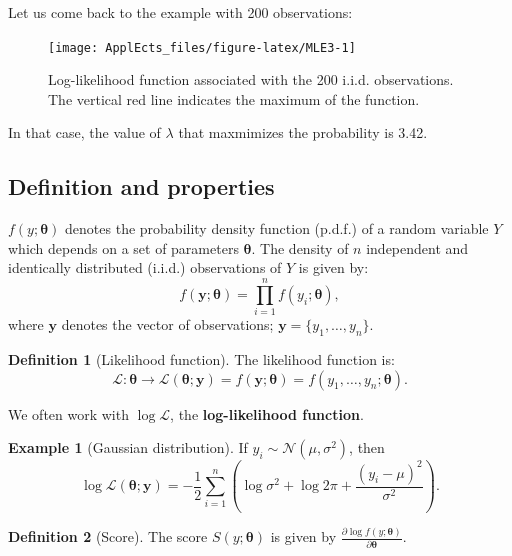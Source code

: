 \documentclass[
  12pt,
]{book}
\theoremstyle{definition}
\newtheorem{definition}{Definition}[chapter]
\theoremstyle{definition}
\newtheorem{example}{Example}[chapter]
\theoremstyle{definition}
\theoremstyle{definition}
\theoremstyle{remark}
\begin{document}
Let us come back to the example with 200 observations:

\begin{figure}
\texttt{[image: ApplEcts\_files/figure-latex/MLE3-1]} \caption{Log-likelihood function associated with the 200 i.i.d. observations. The vertical red line indicates the maximum of the function.}\label{fig:MLE3}
\end{figure}

In that case, the value of \(\lambda\) that maxmimizes the probability is 3.42.

\hypertarget{definition-and-properties}{%
\subsection{Definition and properties}\label{definition-and-properties}}

\(f(y;\boldsymbol\theta)\) denotes the probability density function (p.d.f.) of a random variable \(Y\) which depends on a set of parameters \(\boldsymbol\theta\). The density of \(n\) independent and identically distributed (i.i.d.) observations of \(Y\) is given by:
\[
f(\mathbf{y};\boldsymbol\theta) = \prod_{i=1}^n f(y_i;\boldsymbol\theta),
\]
where \(\mathbf{y}\) denotes the vector of observations; \(\mathbf{y} = \{y_1,\dots,y_n\}\).

\begin{definition}[Likelihood function]
\protect\hypertarget{def:likelihood}{}\label{def:likelihood}The likelihood function is:
\[
\mathcal{L}: \boldsymbol\theta \rightarrow  \mathcal{L}(\boldsymbol\theta;\mathbf{y})=f(\mathbf{y};\boldsymbol\theta)=f(y_1,\dots,y_n;\boldsymbol\theta).
\]
\end{definition}

We often work with \(\log \mathcal{L}\), the \textbf{log-likelihood function}.

\begin{example}[Gaussian distribution]
\protect\hypertarget{exm:normal}{}\label{exm:normal}If \(y_i \sim \mathcal{N}(\mu,\sigma^2)\), then
\[
\log \mathcal{L}(\boldsymbol\theta;\mathbf{y}) = - \frac{1}{2}\sum_{i=1}^n\left( \log \sigma^2 + \log 2\pi + \frac{(y_i-\mu)^2}{\sigma^2} \right).
\]
\end{example}

\begin{definition}[Score]
\protect\hypertarget{def:score}{}\label{def:score}The score \(S(y;\boldsymbol\theta)\) is given by \(\frac{\partial \log f(y;\boldsymbol\theta)}{\partial \boldsymbol\theta}\).
\end{definition}
\end{document}
